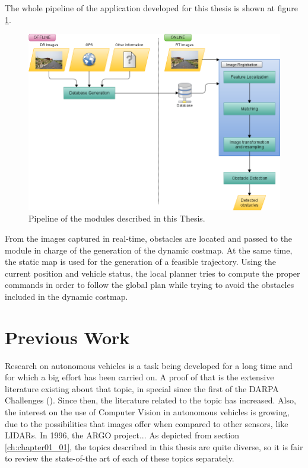  The whole pipeline of the application developed for this thesis is shown at figure \ref{fig:cp01_pipeline}. 
 
\begin{figure}[thb]\label{fig:cp01_pipeline}
  \centering
  \includegraphics{pipeline}
  \caption{Pipeline of the modules described in this Thesis.}
\end{figure}

From the images captured in real-time, obstacles are located and passed to the module in charge of the generation of the dynamic costmap. At the same time, the static map is used for the generation of a feasible trajectory. Using the current position and vehicle status, the local planner tries to compute the proper commands in order to follow the global plan while trying to avoid the obstacles included in the dynamic costmap.

\section{Previous Work}\label{ch:chapter01_02}

Research on autonomous vehicles is a task being developed for a long time and for which a big effort has been carried on. A proof of that is the extensive literature existing about that topic, in special since the first of the DARPA Challenges (\cite{Buehler2007, Buehler2009}). Since then, the literature related to the topic has increased. Also, the interest on the use of Computer Vision in autonomous vehicles is growing, due to the possibilities that images offer when compared to other sensors, like \acp{LIDAR}.
In 1996, the ARGO project... 
As depicted from section \ref{ch:chapter01_01}, the topics described in this thesis are quite diverse, so it is fair to review the state-of-the art of each of these topics separately.

